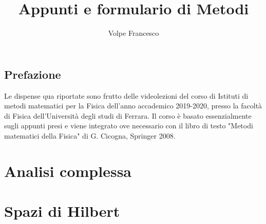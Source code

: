 \documentclass[a4paper,twoside,openany,notitlepage]{book}
\theoremstyle{definition}
\theoremstyle{plain}
\begin{document}
\frontmatter
\author{Volpe Francesco}
\title{Appunti e formulario di Metodi}
\maketitle

\pagestyle{plain}
\tableofcontents

\mainmatter

\chapter*{Prefazione}
Le dispense qua riportate sono frutto delle videolezioni del corso di Istituti di metodi matematici per la Fisica dell'anno accademico 2019-2020, presso la facoltà di Fisica dell'Università degli studi di Ferrara. Il corso è basato essenzialmente sugli appunti presi e viene integrato ove necessario con il libro di testo "Metodi matematici della Fisica" di G. Cicogna, Springer 2008.

\part{Analisi complessa}



\part{Spazi di Hilbert}




\end{document}
